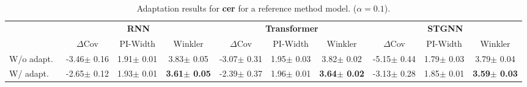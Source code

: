 \begin{table*}[!ht]
\centering
\caption{Adaptation results for \textbf{\gls{cer}} for a reference \gls{method} model. ($\alpha=0.1$).}
\label{t:adaptation}
\setlength{\tabcolsep}{4pt}
\setlength{\aboverulesep}{1pt}
\setlength{\belowrulesep}{1pt}
\begin{tabular}{l ccc ccc ccc}
\toprule
& \multicolumn{3}{c}{\textbf{RNN}} 
& \multicolumn{3}{c}{\textbf{Transformer}} 
& \multicolumn{3}{c}{\textbf{STGNN}} \\
\cmidrule(lr){2-4} \cmidrule(lr){5-7} \cmidrule(lr){8-10}
 
& \(\Delta\)Cov & PI-Width & Winkler 
& \(\Delta\)Cov & PI-Width & Winkler 
& \(\Delta\)Cov & PI-Width & Winkler \\
\midrule
W/o adapt.\
& \textcolor{taborange}{-3.46{\tiny $\pm$ 0.16}} & 1.91{\tiny $\pm$ 0.01} & 3.83{\tiny $\pm$ 0.05}
& \textcolor{taborange}{-3.07{\tiny $\pm$ 0.31}} & 1.95{\tiny $\pm$ 0.03} & 3.82{\tiny $\pm$ 0.02}
& \textcolor{tabred}{-5.15{\tiny $\pm$ 0.44}} & 1.79{\tiny $\pm$ 0.03} & 3.79{\tiny $\pm$ 0.04} \\
W/ adapt.\
& \textcolor{tabolive}{-2.65{\tiny $\pm$ 0.12}} & 1.93{\tiny $\pm$ 0.01} & \textbf{3.61{\tiny $\pm$ 0.05}}
& \textcolor{tabolive}{-2.39{\tiny $\pm$ 0.37}} & 1.96{\tiny $\pm$ 0.01} & \textbf{3.64{\tiny $\pm$ 0.02}}
& \textcolor{taborange}{-3.13{\tiny $\pm$ 0.28}} & 1.85{\tiny $\pm$ 0.01} & \textbf{3.59{\tiny $\pm$ 0.03}} \\
\bottomrule
\end{tabular}
\end{table*}
